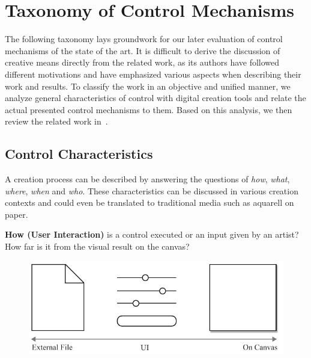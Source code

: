 

\section{Taxonomy of Control Mechanisms}\label{sec:taxo_control_mechanism}

The following taxonomy lays groundwork for our later evaluation of control mechanisms of the state of the art. It is difficult to derive the discussion of creative means directly from the related work, as its authors have followed different motivations and have emphasized various aspects when describing their work and results. To classify the work in an objective and unified manner, we analyze general characteristics of control with digital creation tools and relate the actual presented control mechanisms to them. Based on this analysis, we then review the related work in~.

\newcommand{\controlParamsFigWidth}{0.9}

\subsection{Control Characteristics}\label{control_charateristics}
A creation process can be described by answering the questions of \textit{how}, \textit{what}, \textit{where}, \textit{when} and \textit{who}. These characteristics can be discussed in various creation contexts and could even be translated to traditional media such as aquarell on paper.

\noindent\textbf{How (User Interaction)} is a control executed or an input given by an artist? How far is it from the visual result on the canvas? 

\begin{figure}[H]
    \centering
        \includegraphics[width=\controlParamsFigWidth\linewidth]{figures/control_paradigms/how.pdf}
\end{figure}

